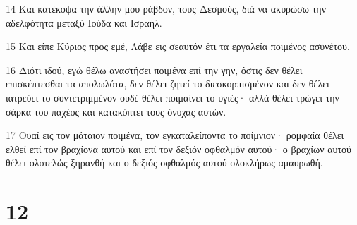 \par 14 Και κατέκοψα την άλλην μου ράβδον, τους Δεσμούς, διά να ακυρώσω την αδελφότητα μεταξύ Ιούδα και Ισραήλ.
\par 15 Και είπε Κύριος προς εμέ, Λάβε εις σεαυτόν έτι τα εργαλεία ποιμένος ασυνέτου.
\par 16 Διότι ιδού, εγώ θέλω αναστήσει ποιμένα επί την γην, όστις δεν θέλει επισκέπτεσθαι τα απολωλότα, δεν θέλει ζητεί το διεσκορπισμένον και δεν θέλει ιατρεύει το συντετριμμένον ουδέ θέλει ποιμαίνει το υγιές· αλλά θέλει τρώγει την σάρκα του παχέος και κατακόπτει τους όνυχας αυτών.
\par 17 Ουαί εις τον μάταιον ποιμένα, τον εγκαταλείποντα το ποίμνιον· ρομφαία θέλει ελθεί επί τον βραχίονα αυτού και επί τον δεξιόν οφθαλμόν αυτού· ο βραχίων αυτού θέλει ολοτελώς ξηρανθή και ο δεξιός οφθαλμός αυτού ολοκλήρως αμαυρωθή.

\chapter{12}

